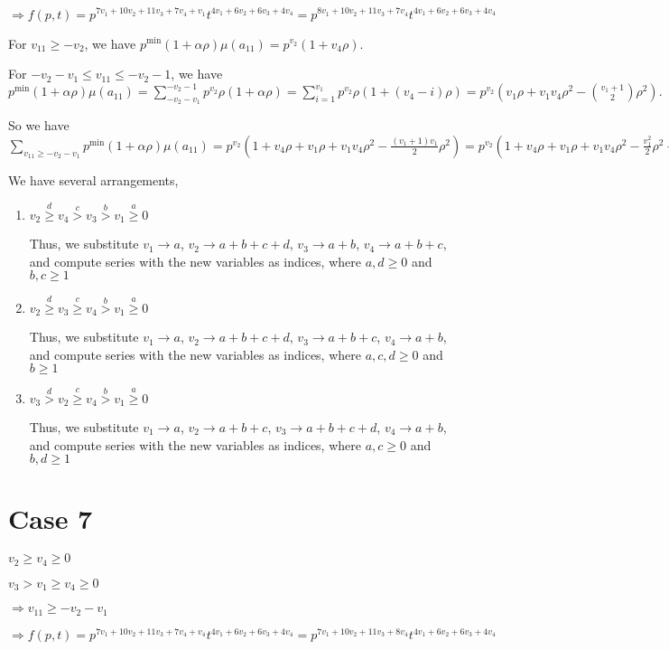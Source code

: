 \documentclass{article}
\begin{document}
     $\Rightarrow{f(p,t)=p^{7v_1+10v_2+11v_3+7v_4+v_1}t^{4v_1+6v_2+6v_3+4v_4}=p^{8v_1+10v_2+11v_3+7v_4}t^{4v_1+6v_2+6v_3+4v_4}}$

For $v_{11}\geq{-v_2}$, we have $p^{\min}(1+\alpha\rho)\mu(a_{11})=p^{v_2}(1+v_4\rho).$

For $-v_2-v_1\leq{v_{11}}\leq{-v_2-1}$, we have $p^{\min}(1+\alpha\rho)\mu(a_{11})=\sum_{-v_2-v_1}^{-v_2-1}p^{v_2}\rho(1+\alpha\rho)=\sum_{i=1}^{v_1}p^{v_2}\rho(1+(v_4-i)\rho)=p^{v_2}(v_1\rho+v_1v_4\rho^2-\binom{v_1+1}{2}\rho^2).$

So we have $\sum_{v_{11}\geq{-v_2-v_1}}p^{\min}(1+\alpha\rho)\mu(a_{11})=p^{v_2}(1+v_4\rho+v_1\rho+v_1v_4\rho^2-\frac{(v_1+1)v_1}{2}\rho^2)=p^{v_2}(1+v_4\rho+v_1\rho+v_1v_4\rho^2-\frac{v_1^2}{2}\rho^2-\frac{v_1}{2}\rho^2).$

We have several arrangements,
\begin{enumerate}
    \item 
$v_2\overset{d}{\geq}v_4\overset{c}{>}v_3\overset{b}{>}{v_1}\overset{a}{\geq}{0}$

Thus, we substitute $v_1\rightarrow{a}$, $v_2\rightarrow{a+b+c+d}$, $v_3\rightarrow{a+b}$, $v_4\rightarrow{a+b+c}$, and compute series with the new variables as indices, where $a,d\geq{0}$ and $b,c\geq{1}$
    \item 
$v_2\overset{d}{\geq}v_3\overset{c}{\geq}v_4\overset{b}{>}{v_1}\overset{a}{\geq}{0}$

Thus, we substitute $v_1\rightarrow{a}$, $v_2\rightarrow{a+b+c+d}$, $v_3\rightarrow{a+b+c}$, $v_4\rightarrow{a+b}$, and compute series with the new variables as indices, where $a,c,d\geq{0}$ and $b\geq{1}$
    \item 
$v_3\overset{d}{>}v_2\overset{c}{\geq}v_4\overset{b}{>}{v_1}\overset{a}{\geq}{0}$

Thus, we substitute $v_1\rightarrow{a}$, $v_2\rightarrow{a+b+c}$, $v_3\rightarrow{a+b+c+d}$, $v_4\rightarrow{a+b}$, and compute series with the new variables as indices, where $a,c\geq{0}$ and $b,d\geq{1}$

\end{enumerate}

\section{Case 7}
$v_2\geq{v_4}\geq{0}$

$v_3>v_1\geq{v_4}\geq{0}$

$\Rightarrow{v_{11}}\geq{-v_2-v_1}$

$\Rightarrow{f(p,t)=p^{7v_1+10v_2+11v_3+7v_4+v_4}t^{4v_1+6v_2+6v_3+4v_4}=p^{7v_1+10v_2+11v_3+8v_4}t^{4v_1+6v_2+6v_3+4v_4}}$
\end{document}
